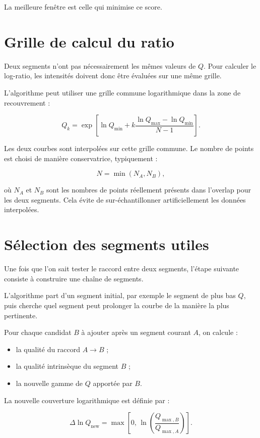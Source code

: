 \documentclass[11pt,a4paper]{article}
\begin{document}
La meilleure fenêtre est celle qui minimise ce score.

\section{Grille de calcul du ratio}

Deux segments n'ont pas nécessairement les mêmes valeurs de $Q$. Pour calculer
le log-ratio, les intensités doivent donc être évaluées sur une même grille.

L'algorithme peut utiliser une grille commune logarithmique dans la zone de
recouvrement :

\[
    Q_k =
    \exp\left[
        \ln Q_{\min}
        +
        k
        \frac{\ln Q_{\max}-\ln Q_{\min}}{N-1}
    \right].
\]

Les deux courbes sont interpolées sur cette grille commune. Le nombre de points
est choisi de manière conservatrice, typiquement :

\[
    N = \min(N_A, N_B),
\]

où $N_A$ et $N_B$ sont les nombres de points réellement présents dans l'overlap
pour les deux segments. Cela évite de sur-échantillonner artificiellement les
données interpolées.

\section{Sélection des segments utiles}

Une fois que l'on sait tester le raccord entre deux segments, l'étape suivante
consiste à construire une chaîne de segments.

L'algorithme part d'un segment initial, par exemple le segment de plus bas $Q$,
puis cherche quel segment peut prolonger la courbe de la manière la plus
pertinente.

Pour chaque candidat $B$ à ajouter après un segment courant $A$, on calcule :

\begin{itemize}[leftmargin=1.5em]
    \item la qualité du raccord $A\rightarrow B$ ;
    \item la qualité intrinsèque du segment $B$ ;
    \item la nouvelle gamme de $Q$ apportée par $B$.
\end{itemize}

La nouvelle couverture logarithmique est définie par :

\[
    \Delta\ln Q_{\mathrm{new}}
    =
    \max
    \left[
        0,\,
        \ln\left(\frac{Q_{\max,B}}{Q_{\max,A}}\right)
    \right].
\]
\end{document}
